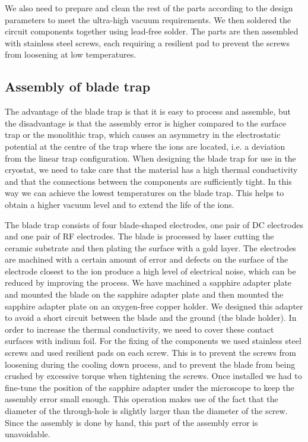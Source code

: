 We also need to prepare and clean the rest of the parts according to the design parameters to meet the ultra-high vacuum requirements. We then soldered the circuit components together using lead-free solder. The parts are then assembled with stainless steel screws, each requiring a resilient pad to prevent the screws from loosening at low temperatures.

\subsection{Assembly of blade trap}

The advantage of the blade trap is that it is easy to process and assemble, but the disadvantage is that the assembly error is higher compared to the surface trap or the monolithic trap, which causes an asymmetry in the electrostatic potential at the centre of the trap where the ions are located, i.e. a deviation from the linear trap configuration. When designing the blade trap for use in the cryostat, we need to take care that the material has a high thermal conductivity and that the connections between the components are sufficiently tight. In this way we can achieve the lowest temperatures on the blade trap. This helps to obtain a higher vacuum level and to extend the life of the ions.

The blade trap consists of four blade-shaped electrodes, one pair of DC electrodes and one pair of RF electrodes. The blade is processed by laser cutting the ceramic substrate and then plating the surface with a gold layer. The electrodes are machined with a certain amount of error and defects on the surface of the electrode closest to the ion produce a high level of electrical noise, which can be reduced by improving the process. We have machined a sapphire adapter plate and mounted the blade on the sapphire adapter plate and then mounted the sapphire adapter plate on an oxygen-free copper holder. We designed this adapter to avoid a short circuit between the blade and the ground (the blade holder). In order to increase the thermal conductivity, we need to cover these contact surfaces with indium foil. For the fixing of the components we used stainless steel screws and used resilient pads on each screw. This is to prevent the screws from loosening during the cooling down process, and to prevent the blade from being crushed by excessive torque when tightening the screws. Once installed we had to fine-tune the position of the sapphire adapter under the microscope to keep the assembly error small enough. This operation makes use of the fact that the diameter of the through-hole is slightly larger than the diameter of the screw. Since the assembly is done by hand, this part of the assembly error is unavoidable.

